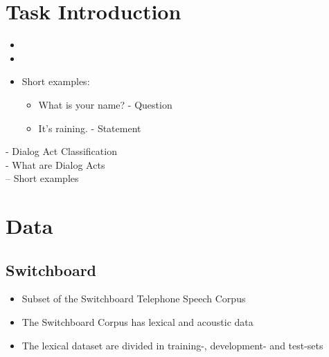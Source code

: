 \documentclass[a0,landscape]{a0poster}
\begin{document}
\begin{multicols}{3} %

\color{Black} %

\section*{Task Introduction}
\begin{itemize}
	\item 
	\item 
	\item Short examples:
	\begin{itemize}
		\item What is your name? - Question
		\item It's raining. - Statement
	\end{itemize}
\end{itemize}
- Dialog Act Classification\\
- What are Dialog Acts\\
-- Short examples\\


\color{Black} %

\section*{Data}
\subsection*{Switchboard}

\begin{itemize}
	\item Subset of the Switchboard Telephone Speech Corpus
	\item The Switchboard Corpus has lexical and acoustic data
	\item The lexical dataset are divided in training-, development- and test-sets
\end{itemize}


\end{multicols}
\end{document}
